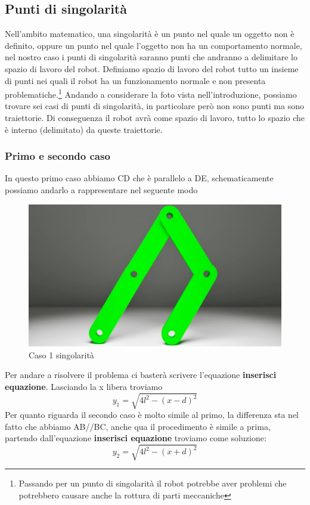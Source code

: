 \subsection{Punti di singolarità}
Nell'ambito matematico, una singolarità è un punto nel quale un oggetto non è definito, oppure un punto nel quale l'oggetto non ha un comportamento normale, nel nostro caso i punti di singolarità saranno punti che andranno a delimitare lo spazio di lavoro del robot. Definiamo spazio di lavoro del robot tutto un insieme di punti nei quali il robot ha un funzionamento normale e non presenta problematiche.\footnote{Passando per un punto di singolarità il robot potrebbe aver problemi che potrebbero causare anche la rottura di parti meccaniche} Andando a considerare la foto vista nell'introduzione, possiamo trovare sei casi di punti di singolarità, in particolare però non sono punti ma sono traiettorie. Di conseguenza il robot avrà come spazio di lavoro, tutto lo spazio che è interno (delimitato) da queste traiettorie.
\subsubsection*{Primo e secondo caso}
In questo primo caso abbiamo CD che è parallelo a DE, schematicamente possiamo andarlo a rappresentare nel seguente modo
\begin{figure}[ht]
	\begin{center}
		\includegraphics[scale=0.45]{Immagini/Singolarity/1}
		\caption{Caso 1 singolarità}
	\end{center}
\end{figure}
Per andare a risolvere il problema ci basterà scrivere l'equazione \textbf{inserisci equazione}. Lasciando la x libera troviamo 
\begin{equation}
    y_1 = \sqrt{4l^2-(x-d)^2}
\end{equation}
Per quanto riguarda il secondo caso è molto simile al primo, la differenza sta nel fatto che abbiamo AB//BC, anche qua il procedimento è simile a prima, partendo dall'equazione \textbf{inserisci equazione} troviamo come soluzione:
\begin{equation}
    y_2 = \sqrt{4l^2-(x+d)^2}
\end{equation}

